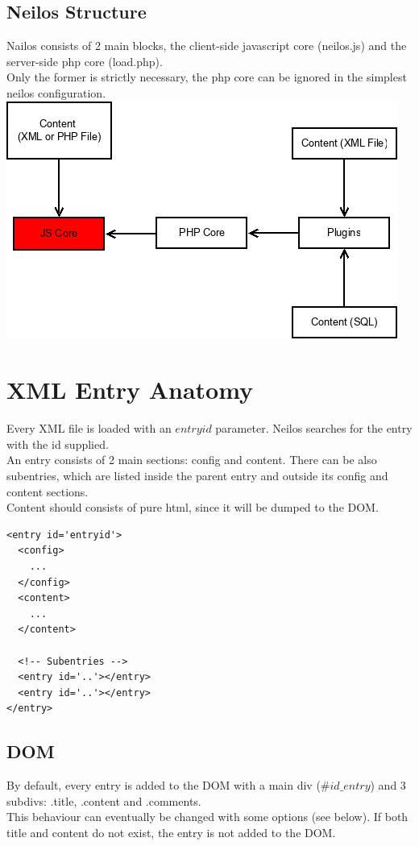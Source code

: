 \documentclass[a4paper,12pt]{article}
\begin{document}
\subsection{Neilos Structure}
Nailos consists of 2 main blocks, the client-side javascript core (neilos.js) and the server-side php core (load.php).\\
Only the former is strictly necessary, the php core can be ignored in the simplest neilos configuration.\\
\includegraphics[scale=0.7]{neilos_structure.png} \\
\section{XML Entry Anatomy}
Every XML file is loaded with an $entryid$ parameter. Neilos searches for the entry with the id supplied.\\
An entry consists of 2 main sections: config and content. There can be also subentries, which are listed inside the parent entry and outside its config and content sections.\\
Content should consists of pure html, since it will be dumped to the DOM.\\
\footnotesize
\begin{verbatim}
<entry id='entryid'>
  <config>
    ...
  </config>
  <content>
    ...
  </content>

  <!-- Subentries -->
  <entry id='..'></entry>
  <entry id='..'></entry>
</entry>
\end{verbatim}
\normalsize
\subsection{DOM}
By default, every entry is added to the DOM with a main div ($\#id\_entry$) and 3 subdivs: .title, .content and .comments.\\
This behaviour can eventually be changed with some options (see below). If both title and content do not exist, the entry is not added to the DOM.
\end{document}

